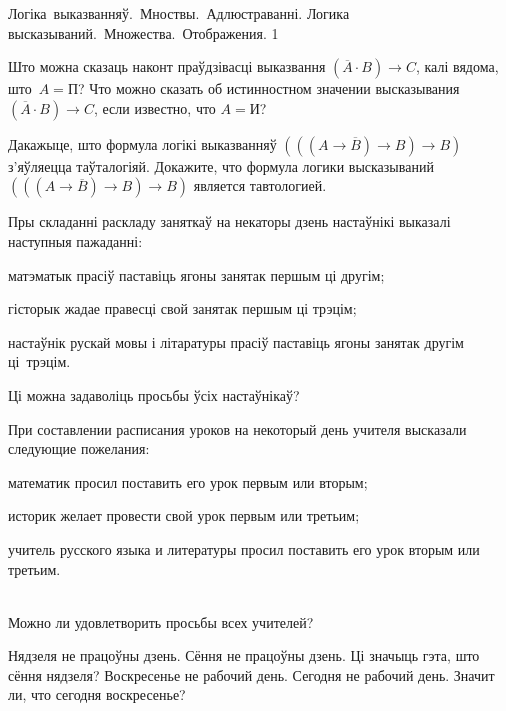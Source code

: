 



\quizTitle
{Логіка~выказванняў.~Мноствы.~Адлюстраванні.}
{Логика высказываний.~Множества.~Отображения.}
{1}

\begin{problemList}

\problemItemSimple
{Што можна сказаць наконт праўдзівасці выказвання $(\overline{A} \cdot B) \to C$, калі вядома, што~$A = \mbox{П}$?}
{Что можно сказать об истинностном значении высказывания $(\overline{A} \cdot B) \to C$, если известно, что $A = \mbox{И}$?}

\bigskip

\problemItemSimple
{Дакажыце, што формула логікі выказванняў $(((A \to \overline{B}) \to B) \to B)$ з'яўляецца таўталогіяй.}
{Докажите, что формула логики высказываний $(((A \to \overline{B}) \to B) \to B)$ является тавтологией.}

\bigskip

\problemItemSimple
{Пры складанні раскладу заняткаў на некаторы дзень настаўнікі выказалі наступныя пажаданні:
\begin{belarusianEnumerate}
    \item матэматык прасіў паставіць ягоны занятак першым ці другім;
    \item гісторык жадае правесці свой занятак першым ці трэцім;
    \item настаўнік рускай мовы і літаратуры прасіў паставіць ягоны занятак другім ці~трэцім.
\end{belarusianEnumerate}

\vspace{-8pt}
Ці можна задаволіць просьбы ўсіх настаўнікаў?}
{При составлении расписания уроков на некоторый день учителя высказали следующие пожелания:
\begin{russianEnumerate}
    \item математик просил поставить его урок первым или вторым;
    \item историк желает провести свой урок первым или третьим;
    \item учитель русского языка и литературы просил поставить его урок вторым или третьим.
\end{russianEnumerate}\\
Можно ли удовлетворить просьбы всех учителей?}

\bigskip

\problemItemSimple
{Нядзеля не працоўны дзень. Сёння не працоўны дзень. Ці значыць гэта, што сёння нядзеля?}
{Воскресенье не рабочий день. Сегодня не рабочий день. Значит ли, что сегодня воскресенье?}


\end{problemList}
